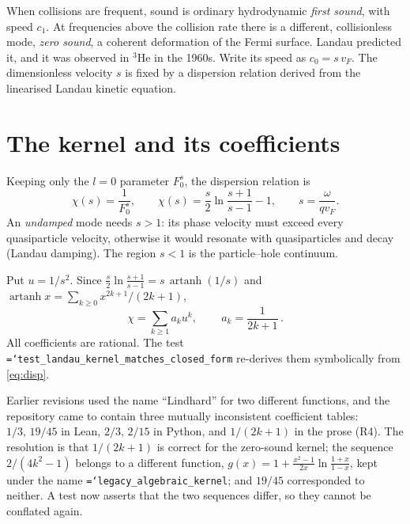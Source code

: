 \documentclass[11pt,a4paper,openany]{book}
\newcommand{\Fzs}{F_0^{s}}
\newcommand{\code}[1]{\texttt{\hyphenchar\font=`\-\relax #1}}
\theoremstyle{definition}
\theoremstyle{plain}
\begin{document}
When collisions are frequent, sound is ordinary hydrodynamic \emph{first sound}, with speed $c_1$.
At frequencies above the collision rate there is a different, collisionless mode, \emph{zero
sound}, a coherent deformation of the Fermi surface. Landau predicted it, and it was observed in
$^3$He in the 1960s. Write its speed as $c_0=s\,v_F$. The dimensionless velocity $s$ is fixed by a
dispersion relation derived from the linearised Landau kinetic equation.

\section{The kernel and its coefficients}

Keeping only the $l=0$ parameter $\Fzs$, the dispersion relation is
\begin{equation}
  \chi(s)=\frac{1}{\Fzs},\qquad
  \chi(s)=\frac s2\ln\frac{s+1}{s-1}-1,\qquad s=\frac{\omega}{qv_F}.
  \label{eq:disp}
\end{equation}
An \emph{undamped} mode needs $s>1$: its phase velocity must exceed every quasiparticle velocity,
otherwise it would resonate with quasiparticles and decay (Landau damping). The region $s<1$ is the
particle--hole continuum.

Put $u=1/s^2$. Since $\frac s2\ln\frac{s+1}{s-1}=s\,\operatorname{artanh}(1/s)$ and
$\operatorname{artanh}x=\sum_{k\ge0}x^{2k+1}/(2k+1)$,
\begin{equation}
  \chi=\sum_{k\ge1}a_ku^k,\qquad \boxed{\,a_k=\frac1{2k+1}\,}.
  \label{eq:ak}
\end{equation}
All coefficients are rational. The test \code{test\_landau\_kernel\_matches\_closed\_form}
re-derives them symbolically from \eqref{eq:disp}.

\begin{lesson}
Earlier revisions used the name ``Lindhard'' for two different functions, and the repository came
to contain three mutually inconsistent coefficient tables: $1/3,\,19/45$ in Lean,
$2/3,\,2/15$ in Python, and $1/(2k+1)$ in the prose (R4). The resolution is that $1/(2k+1)$ is
correct for the zero-sound kernel; the sequence $2/(4k^2-1)$ belongs to a different function,
$g(x)=1+\frac{x^2-1}{2x}\ln\frac{1+x}{1-x}$, kept under the name \code{legacy\_algebraic\_kernel};
and $19/45$ corresponded to neither. A test now asserts that the two sequences differ, so they
cannot be conflated again.
\end{lesson}
\end{document}
